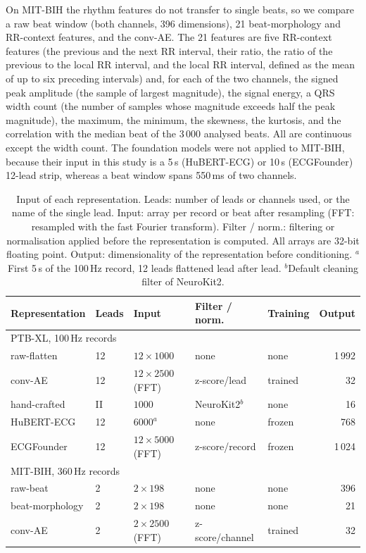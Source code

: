 \documentclass[preprint,11pt]{elsarticle}
\begin{document}
On MIT-BIH the rhythm features do not transfer to single beats, so we compare a raw
beat window (both channels, 396 dimensions), 21 beat-morphology and RR-context features,
and the conv-AE. The 21 features are five RR-context features (the previous and the next
RR interval, their ratio, the ratio of the previous to the local RR interval, and the
local RR interval, defined as the mean of up to six preceding intervals) and, for each of
the two channels, the signed peak amplitude (the sample of largest magnitude), the signal
energy, a QRS width count (the number of samples whose magnitude exceeds half the peak
magnitude), the maximum, the minimum, the
skewness, the kurtosis, and the correlation with the median beat of the 3\,000 analysed
beats. All are continuous except the width count. The foundation models were not applied
to MIT-BIH, because their input in this study is a 5\,s (HuBERT-ECG) or 10\,s (ECGFounder)
12-lead strip, whereas a beat window spans 550\,ms of two channels.

\begin{table}[t]
\centering
\footnotesize
\caption{Input of each representation. Leads: number of leads or channels used, or the
name of the single lead. Input: array per record or beat after resampling (FFT: resampled
with the fast Fourier transform). Filter / norm.: filtering or normalisation applied
before the representation is computed. All arrays are 32-bit floating point. Output:
dimensionality of the representation before conditioning. $^{a}$First 5\,s of the
100\,Hz record, 12 leads flattened lead after lead. $^{b}$Default cleaning filter of
NeuroKit2.}
\label{tab:repr}
\setlength{\tabcolsep}{4pt}
\begin{tabular}{lllllr}
\toprule
Representation & Leads & Input & Filter / norm. & Training & Output \\
\midrule
\multicolumn{6}{l}{PTB-XL, 100\,Hz records} \\
raw-flatten     & 12 & $12 \times 1000$ & none & none & 1\,992 \\
conv-AE         & 12 & $12 \times 2500$ (FFT) & z-score/lead & trained & 32 \\
hand-crafted    & II & $1000$ & NeuroKit2$^{b}$ & none & 16 \\
HuBERT-ECG      & 12 & $6000^{a}$ & none & frozen & 768 \\
ECGFounder      & 12 & $12 \times 5000$ (FFT) & z-score/record & frozen & 1\,024 \\
\midrule
\multicolumn{6}{l}{MIT-BIH, 360\,Hz records} \\
raw-beat        & 2  & $2 \times 198$ & none & none & 396 \\
beat-morphology & 2  & $2 \times 198$ & none & none & 21 \\
conv-AE         & 2  & $2 \times 2500$ (FFT) & z-score/channel & trained & 32 \\
\bottomrule
\end{tabular}
\end{table}
\end{document}
